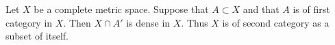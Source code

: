 Let $X$ be a complete metric space. Suppose that $A \subset X$ and that $A$ is of first category in $X$. Then $X \cap A'$ is dense in $X$. Thus $X$ is of second category as a subset of itself.